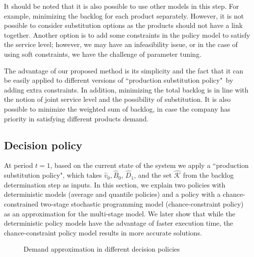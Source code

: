 \documentclass[11pt]{article}
\newcommand{\ti}{t} %
\newcommand{\KA}{\mathcal{K}}
\newcommand{\tAct}{\hat{\ti}} %
\newcommand{\PSpolicy}{``production substitution policy"}
\newcommand{\cred}{\color{black}}
\begin{document}
It should be noted that it is also possible to use other models in this step. For example, minimizing the backlog for each product separately. However, it is not possible to consider substitution options as the products should not have a link together. Another option is to add some constraints in the policy model to satisfy the service level; however, we may have an infeasibility issue, or in the case of using soft constraints, we have the challenge of parameter tuning.

The advantage of our proposed method is its simplicity and the fact that it can be easily applied to different versions of \PSpolicy \ by adding extra constraints. In addition, minimizing the total backlog is in line with the notion of joint service level and the possibility of substitution. It is also possible to minimize the weighted sum of backlog, in case the company has priority in satisfying different products demand. 

\subsection{Decision policy} %
At period $\ti =1$, based on the current state of the system we apply a \PSpolicy, which takes $\hat{v}_{0}, \hat{B}_{0}$, $\hat{D}_1$, and the set $\hat{\KA}$ from the backlog determination step as inputs. 
In this section, we explain two policies with deterministic models (average and quantile policies) and a policy with a chance-constrained two-stage stochastic programming model (chance-constraint policy) as an approximation for the multi-stage model.
We later show that while the deterministic policy models have the advantage of faster execution time, the chance-constraint policy model results in more accurate solutions.
\begin{figure} [H]
    \centering 
    \caption{Demand approximation in different decision policies}%
    \label{fig:DemandPolicy}%
\end{figure}
\end{document}
